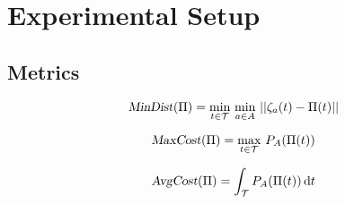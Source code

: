 


\chapter{Experimental Setup}

\label{chapter:experimentalsetup}

\section{Metrics}

\begin{equation}
    \Var{MinDist}(\Pi) = \min_{t \in \mathcal{T}} \, \min_{a \in A} \,
    ||\zeta_a(t) - \Pi(t)||
    \label{eq:md_metric}
\end{equation}

\begin{equation}
    \Var{MaxCost}(\Pi) = \max_{t \in \mathcal{T}} \, P_A(\Pi(t))
    \label{eq:cost_metric}
\end{equation}

\begin{equation}
    \Var{AvgCost}(\Pi) = \int_{\mathcal{T}} P_A(\Pi(t)) \, \mathrm{d}t
    \label{eq:avg_cost_metric}
\end{equation}


